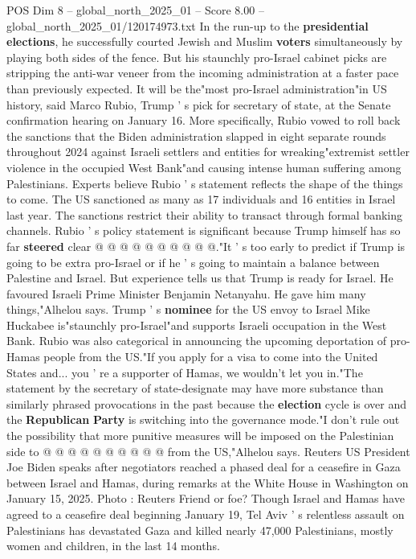 \begin{textsample}{POS Dim 8 – global\_north\_2025\_01 – Score 8.00 – global\_north\_2025\_01/120174973.txt}  \label{ex:f8_pos_292}
In the run-up to the \textbf{presidential} \textbf{elections}, he successfully courted Jewish and Muslim \textbf{voters} simultaneously by playing both sides of the fence.
But his staunchly pro-Israel cabinet picks are stripping the anti-war veneer from the incoming administration at a faster pace than previously expected.
It will be the"most pro-Israel administration"in US history, said Marco Rubio, Trump ' s pick for secretary of state, at the Senate confirmation hearing on January 16.
More specifically, Rubio vowed to roll back the sanctions that the Biden administration slapped in eight separate rounds throughout 2024 against Israeli settlers and entities for wreaking"extremist settler violence in the occupied West Bank"and causing intense human suffering among Palestinians.
Experts believe Rubio ' s statement reflects the shape of the things to come.
The US sanctioned as many as 17 individuals and 16 entities in Israel last year.
The sanctions restrict their ability to transact through formal banking channels.
Rubio ' s policy statement is significant because Trump himself has so far \textbf{steered} clear @ @ @ @ @ @ @ @ @ @."It ' s too early to predict if Trump is going to be extra pro-Israel or if he ' s going to maintain a balance between Palestine and Israel.
But experience tells us that Trump is ready for Israel.
He favoured Israeli Prime Minister Benjamin Netanyahu.
He gave him many things,"Alhelou says.
Trump ' s \textbf{nominee} for the US envoy to Israel Mike Huckabee is"staunchly pro-Israel"and supports Israeli occupation in the West Bank.
Rubio was also categorical in announcing the upcoming deportation of pro-Hamas people from the US."If you apply for a visa to come into the United States and... you ' re a supporter of Hamas, we wouldn't let you in."The statement by the secretary of state-designate may have more substance than similarly phrased provocations in the past because the \textbf{election} cycle is over and the \textbf{Republican} \textbf{Party} is switching into the governance mode."I don't rule out the possibility that more punitive measures will be imposed on the Palestinian side to @ @ @ @ @ @ @ @ @ @ from the US,"Alhelou says.
Reuters US President Joe Biden speaks after negotiators reached a phased deal for a ceasefire in Gaza between Israel and Hamas, during remarks at the White House in Washington on January 15, 2025.
Photo : Reuters Friend or foe?
Though Israel and Hamas have agreed to a ceasefire deal beginning January 19, Tel Aviv ' s relentless assault on Palestinians has devastated Gaza and killed nearly 47,000 Palestinians, mostly women and children, in the last 14 months.

\end{textsample}
